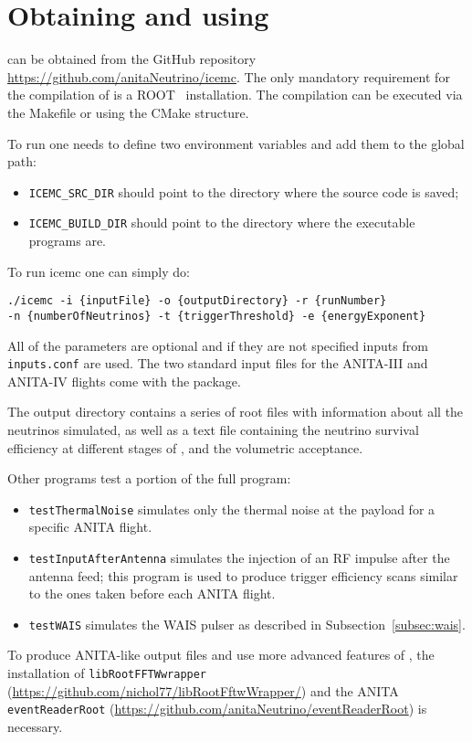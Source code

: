 \appendix

\section{Obtaining and using \icemc}
\icemc can be obtained from the GitHub repository \url{https://github.com/anitaNeutrino/icemc}.
The only mandatory requirement for the compilation of \icemc is a ROOT~\cite{brun1997root} installation.
The compilation can be executed via the Makefile or using the CMake structure.

To run \icemc one needs to define two environment variables and add them to the global path:
\begin{itemize}
    \item  \texttt{ICEMC\_SRC\_DIR} should point to the directory where the source code is saved;
    \item  \texttt{ICEMC\_BUILD\_DIR} should point to the directory where the executable programs are.
\end{itemize}

To run icemc one can simply do:
\begin{verbatim}
./icemc -i {inputFile} -o {outputDirectory} -r {runNumber}
-n {numberOfNeutrinos} -t {triggerThreshold} -e {energyExponent}
\end{verbatim}

All of the parameters are optional and if they are not specified inputs from \texttt{inputs.conf} are used. 
The two standard input files for the ANITA-III and ANITA-IV flights come with the package.

The output directory contains a series of root files with  information about all the neutrinos simulated, as well as a text file containing the neutrino survival efficiency at different stages of \icemc, and the volumetric acceptance.

Other programs test a portion of the full \icemc program:
\begin{itemize}
    \item {\tt testThermalNoise} simulates only the thermal noise at the payload for a specific ANITA flight.
    \item {\tt testInputAfterAntenna} simulates the injection of an RF impulse after the antenna feed; this program is used to produce trigger efficiency scans similar to the ones taken before each ANITA flight.
    \item {\tt testWAIS} simulates the WAIS pulser as described in Subsection~\ref{subsec:wais}.
\end{itemize}

To produce ANITA-like output files and use more advanced features of \icemc, the installation of \texttt{libRootFFTWwrapper} (\url{https://github.com/nichol77/libRootFftwWrapper/}) and the ANITA \texttt{eventReaderRoot} (\url{https://github.com/anitaNeutrino/eventReaderRoot}) is necessary. 

